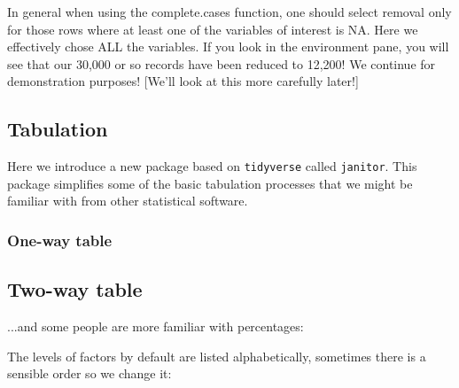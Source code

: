 \documentclass[titlepage]{book}\usepackage{knitr}
\begin{document}
In general when using the complete.cases function, one should select removal only for those rows where at least one of the variables of interest is NA. Here we effectively chose ALL the variables.  If you look in the environment pane, you will see that our 30,000 or so records have been reduced to 12,200! We continue for demonstration purposes! [We'll look at this more carefully later!]

\subsection{Tabulation}

Here we introduce a new package based on \texttt{tidyverse} called \texttt{janitor}.  This package simplifies some of the basic tabulation processes that we might be familiar with from other statistical software.

\subsubsection{One-way table}

\begin{knitrout}
\color{fgcolor}
\end{knitrout}

\subsection{Two-way table}
\begin{knitrout}
\color{fgcolor}
\end{knitrout}

...and some people are more familiar with percentages:

\begin{knitrout}
\color{fgcolor}
\end{knitrout}
The levels of factors by default are listed alphabetically, sometimes there is a sensible order so we change it:
\end{document}
